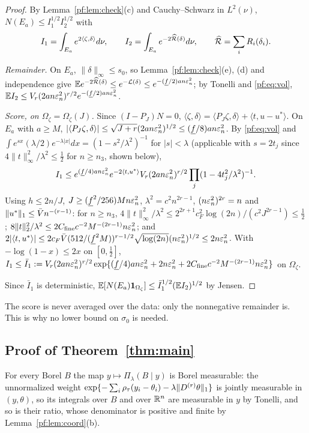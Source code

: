 \begin{proof}
By Lemma~\ref{pf:lem:check}(c) and Cauchy--Schwarz in $L^2(\nu)$,
$N(E_a)\le I_1^{1/2}I_2^{1/2}$ with
\[
I_1=\int_{E_a}e^{2\langle\zeta,\delta\rangle}d\nu,\qquad I_2=\int_{E_a}e^{-2\widehat{\mathcal R}(\delta)}d\nu,\qquad \widehat{\mathcal R}=\sum_iR_i(\delta_i).
\]

\emph{Remainder.} On $E_a$, $\|\delta\|_\infty\le s_0$, so Lemma~\ref{pf:lem:check}(e), (d) and independence give $\mathbb{E} e^{-2\widehat{\mathcal R}(\delta)}\le e^{-\mathcal L(\delta)}\le e^{-(\underline f/2)an\varepsilon_n^2}$; by Tonelli and \eqref{pf:eq:vol}, $\mathbb{E} I_2\le V_r(2an\varepsilon_n^2)^{r/2}e^{-(\underline f/2)an\varepsilon_n^2}$.

\emph{Score, on $\Omega_\zeta=\Omega_\zeta(J)$.} Since $(I-P_J)N=0$, $\langle\zeta,\delta\rangle=\langle P_J\zeta,\delta\rangle+\langle t,u-u^{*}\rangle$. On $E_a$ with $a\ge M$, $|\langle P_J\zeta,\delta\rangle|\le\sqrt{J+r}(2an\varepsilon_n^2)^{1/2}\le(\underline f/8)an\varepsilon_n^2$. By \eqref{pf:eq:vol} and $\int e^{sx}(\lambda/2)e^{-\lambda|x|}dx=(1-s^2/\lambda^2)^{-1}$ for $|s|<\lambda$ (applicable with $s=2t_j$ since $4\|t\|_\infty^2/\lambda^2\le\frac12$ for $n\ge n_3$, shown below),
\[
I_1\le e^{(\underline f/4)an\varepsilon_n^2}e^{-2\langle t,u^{*}\rangle}V_r(2an\varepsilon_n^2)^{r/2}\prod_j(1-4t_j^2/\lambda^2)^{-1}.
\]
Using $h\le2n/J$, $J\ge(\underline f^2/256)Mn\varepsilon_n^2$, $\lambda^2=c^2n^{2r-1}$, $(n\varepsilon_n^2)^{2r}=n$ and $\|u^{*}\|_1\le\bar V n^{-(r-1)}$: for $n\ge n_3$, $4\|t\|_\infty^2/\lambda^2\le2^{2r+1}c_F^2\log(2n)/(c^2J^{2r-1})\le\frac12$; $8\|t\|_2^2/\lambda^2\le2C_{\rm fine}c^{-2}M^{-(2r-1)}n\varepsilon_n^2$; and $2|\langle t,u^{*}\rangle|\le2c_F\bar V(512/(\underline f^2M))^{r-1/2}\sqrt{\log(2n)}(n\varepsilon_n^2)^{1/2}\le2n\varepsilon_n^2$. With $-\log(1-x)\le2x$ on $[0,\frac12]$,
$I_1\le\bar I_1:=V_r(2an\varepsilon_n^2)^{r/2}\exp\{(\underline f/4)an\varepsilon_n^2+2n\varepsilon_n^2+2C_{\rm fine}c^{-2}M^{-(2r-1)}n\varepsilon_n^2\}$ on $\Omega_\zeta$.

Since $\bar I_1$ is deterministic, $\mathbb{E}[N(E_a)\mathbf 1_{\Omega_\zeta}]\le\bar I_1^{1/2}(\mathbb{E} I_2)^{1/2}$ by Jensen.
\end{proof}

The score is never averaged over the data: only the nonnegative remainder is. This is why no lower bound on $\sigma_0$ is needed.

\subsection{Proof of Theorem~\ref{thm:main}}

For every Borel $B$ the map $y\mapsto\Pi_\lambda(B\mid y)$ is Borel measurable: the unnormalized weight $\exp\{-\sum_i\rho_\tau(y_i-\theta_i)-\lambda\|D^{(r)}\theta\|_1\}$ is jointly measurable in $(y,\theta)$, so its integrals over $B$ and over $\mathbb{R}^n$ are measurable in $y$ by Tonelli, and so is their ratio, whose denominator is positive and finite by Lemma~\ref{pf:lem:coord}(b).

